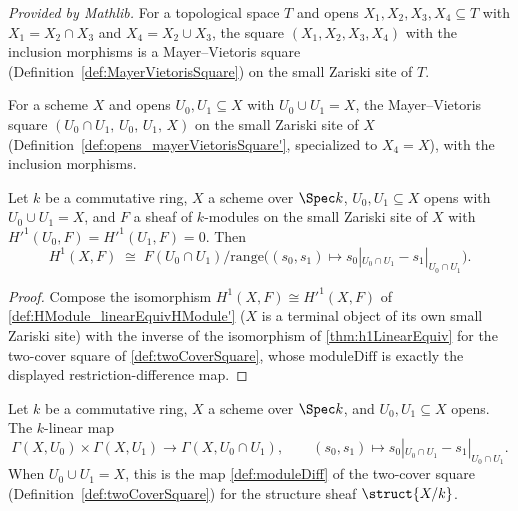 \begin{definition}
  \label{def:opens_mayerVietorisSquare'}
  \mathlibok
  \textit{Provided by Mathlib.}
  For a topological space \(T\) and opens \(X_1,X_2,X_3,X_4 \subseteq T\) with
  \(X_1 = X_2 \cap X_3\) and \(X_4 = X_2 \cup X_3\), the square \((X_1,X_2,X_3,X_4)\) with the
  inclusion morphisms is a Mayer--Vietoris square (Definition~\ref{def:MayerVietorisSquare})
  on the small Zariski site of \(T\).
\end{definition}

\begin{definition}
  \label{def:twoCoverSquare}
  \leanok
  For a scheme \(X\) and opens \(U_0, U_1 \subseteq X\) with \(U_0 \cup U_1 = X\), the
  Mayer--Vietoris square \((U_0 \cap U_1,\, U_0,\, U_1,\, X)\) on the small Zariski site of
  \(X\) (Definition~\ref{def:opens_mayerVietorisSquare'}, specialized to \(X_4 = X\)), with
  the inclusion morphisms.
\end{definition}

\begin{theorem}
  \label{thm:twoCoverH1LinearEquiv}
  \leanok
  Let \(k\) be a commutative ring, \(X\) a scheme over \(\Spec k\), \(U_0, U_1 \subseteq X\)
  opens with \(U_0 \cup U_1 = X\), and \(F\) a sheaf of \(k\)-modules on the small Zariski
  site of \(X\) with \(H'^1(U_0,F) = H'^1(U_1,F) = 0\). Then
  \[
    H^1(X,F) \;\cong\;
      F(U_0 \cap U_1) \big/ \mathrm{range}\bigl((s_0,s_1) \mapsto
        s_0|_{U_0 \cap U_1} - s_1|_{U_0 \cap U_1}\bigr) .
  \]
\end{theorem}
\begin{proof}
  \leanok
  Compose the isomorphism \(H^1(X,F) \cong H'^1(X,F)\) of
  \ref{def:HModule_linearEquivHModule'} (\(X\) is a terminal object of its own small Zariski
  site) with the inverse of the isomorphism of \ref{thm:h1LinearEquiv} for the two-cover
  square of \ref{def:twoCoverSquare}, whose \(\mathrm{moduleDiff}\) is exactly the displayed
  restriction-difference map.
\end{proof}

\begin{definition}
  \label{def:TwoCover_diff}
  \leanok
  Let \(k\) be a commutative ring, \(X\) a scheme over \(\Spec k\), and \(U_0, U_1 \subseteq X\)
  opens. The \(k\)-linear map
  \[
    \Gamma(X,U_0) \times \Gamma(X,U_1) \longrightarrow \Gamma(X, U_0 \cap U_1), \qquad
    (s_0,s_1) \longmapsto s_0|_{U_0 \cap U_1} - s_1|_{U_0 \cap U_1} .
  \]
  When \(U_0 \cup U_1 = X\), this is the map \ref{def:moduleDiff} of the two-cover square
  (Definition~\ref{def:twoCoverSquare}) for the structure sheaf \(\struct{X/k}\).
\end{definition}

